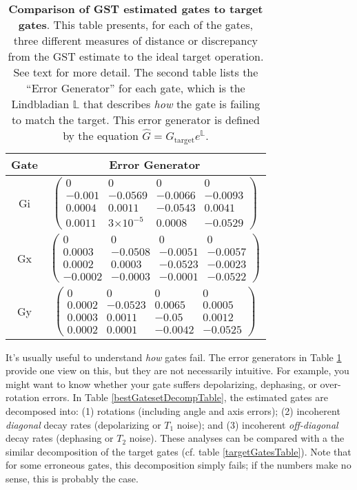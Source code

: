 \documentclass{article}[11pt]
\providecommand{\e}[1]{\ensuremath{\times 10^{#1}}}
\begin{document}
\begin{table}[h]
\begin{center}
\vspace{2em}
\begin{tabular}[l]{|c|c|}
\hline
Gate & Error Generator \\ \hline
Gi & $ \left(\!\!\begin{array}{cccc}
0 & 0 & 0 & 0 \\ 
-0.001 & -0.0569 & -0.0066 & -0.0093 \\ 
0.0004 & 0.0011 & -0.0543 & 0.0041 \\ 
0.0011 & 3\e{-5} & 0.0008 & -0.0529
 \end{array}\!\!\right) $
 \\ \hline
Gx & $ \left(\!\!\begin{array}{cccc}
0 & 0 & 0 & 0 \\ 
0.0003 & -0.0508 & -0.0051 & -0.0057 \\ 
0.0002 & 0.0003 & -0.0523 & -0.0023 \\ 
-0.0002 & -0.0003 & -0.0001 & -0.0522
 \end{array}\!\!\right) $
 \\ \hline
Gy & $ \left(\!\!\begin{array}{cccc}
0 & 0 & 0 & 0 \\ 
0.0002 & -0.0523 & 0.0065 & 0.0005 \\ 
0.0003 & 0.0011 & -0.05 & 0.0012 \\ 
0.0002 & 0.0001 & -0.0042 & -0.0525
 \end{array}\!\!\right) $
 \\ \hline
\end{tabular}

\caption{\textbf{Comparison of GST estimated gates to target gates}.  This table presents, for each of the gates, three different measures of distance or discrepancy from the GST estimate to the ideal target operation.  See text for more detail.  The second table lists the ``Error Generator'' for each gate, which is the Lindbladian $\mathbb{L}$ that describes \emph{how} the gate is failing to match the target.  This error generator is defined by the equation $\hat{G} = G_{\mathrm{target}}e^{\mathbb{L}}$. \label{bestGatesetVsTargetTable}}
\end{center}
\end{table}

It's usually useful to understand \emph{how} gates fail.  The error generators in Table \ref{bestGatesetVsTargetTable} provide one view on this, but they are not necessarily intuitive.   For example, you might want to know whether your gate suffers depolarizing, dephasing, or over-rotation errors.  In Table \ref{bestGatesetDecompTable}, the estimated gates are decomposed into: (1) rotations (including angle and axis errors); (2) incoherent \emph{diagonal} decay rates (depolarizing or $T_1$ noise); and (3) incoherent \emph{off-diagonal} decay rates (dephasing or $T_2$ noise).  These analyses can be compared with a the similar decomposition of the target gates (cf. table \ref{targetGatesTable}).  Note that for some erroneous gates, this decomposition simply fails; if the numbers make no sense, this is probably the case.
\end{document}
